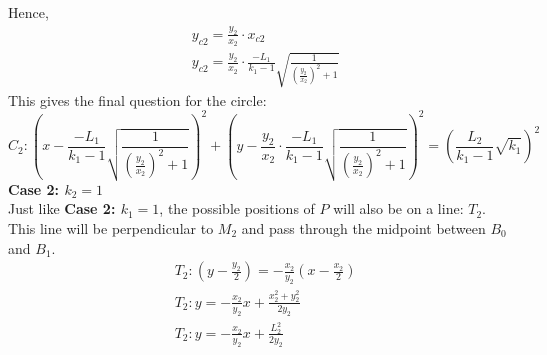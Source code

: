 \documentclass[a4paper,12pt]{article}
\begin{document}
Hence,
\begin{equation*}
    \begin{split}
        &y_{c2}=\frac{y_2}{x_2}\cdot x_{c2}\\
        &y_{c2}=\frac{y_2}{x_2}\cdot \frac{-L_1}{k_1-1}\sqrt{\frac{1}{\left(\frac{y_2}{x_2}\right)^2+1}}
    \end{split}
\end{equation*}
This gives the final question for the circle:
\begin{equation*}
    C_2: \left(x-\frac{-L_1}{k_1-1}\sqrt{\frac{1}{\left(\frac{y_2}{x_2}\right)^2+1}}\right)^2 + \left(y-\frac{y_2}{x_2}\cdot \frac{-L_1}{k_1-1}\sqrt{\frac{1}{\left(\frac{y_2}{x_2}\right)^2+1}}\right)^2= \left(\frac{L_2}{k_1-1}\sqrt{k_1}\right)^2
\end{equation*} 
\textbf{Case 2: $k_2=1$}\\
Just like \textbf{Case 2: $k_1=1$}, the possible positions of $P$ will also be on a line: $T_2$. This line will be perpendicular to $M_2$ and pass through the midpoint between $B_0$ and $B_1$.
\begin{equation*}
    \begin{split}
        &T_2: \left(y-\frac{y_2}{2} \right)= -\frac{x_2}{y_2}\left(x-\frac{x_2}{2} \right)\\
        &T_2: y=-\frac{x_{2}}{y_{2}}x+\frac{x_{2}^{2}+y_{2}^{2}}{2y_{2}}\\
        &T_2: y=-\frac{x_{2}}{y_{2}}x+\frac{L_2^2}{2y_{2}}\\
    \end{split}
\end{equation*}
\end{document}
